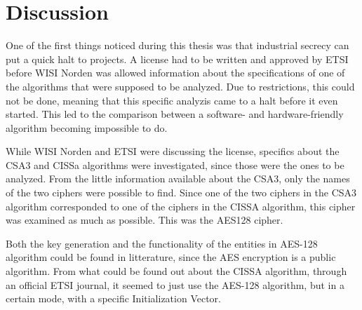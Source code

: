 
\section{Discussion}
One of the first things noticed during this thesis was that industrial
secrecy can put a quick halt to projects. A license had to be written 
and approved by ETSI before WISI Norden was allowed information about 
the specifications of one of the algorithms that were supposed to be
analyzed. Due to restrictions, this could not be done, meaning that 
this specific analyzis came to a halt before it even started. This 
led to the comparison between a software- and hardware-friendly 
algorithm becoming impossible to do. 

While WISI Norden and ETSI were discussing the license, specifics 
about the CSA3 and CISSa algorithms were investigated, since those 
were the ones to be analyzed. From the little information available 
about the CSA3, only the names of the two ciphers were possible to 
find. Since one of the two ciphers in the CSA3 algorithm corresponded 
to one of the ciphers in the CISSA algorithm, this cipher was examined 
as much as possible. This was the AES128 cipher.

Both the key generation and the functionality of the entities in 
AES-128 algorithm could be found in litterature, since the AES 
encryption is a public algorithm. From what could be found out about 
the CISSA algorithm, through an official ETSI journal, it seemed to 
just use the AES-128 algorithm, but in a certain mode, with a specific 
Initialization Vector.


